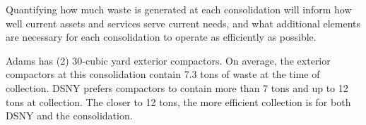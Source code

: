 
    Quantifying how much waste is generated at each consolidation will inform how well current assets and services serve current needs, and what additional elements are necessary for each consolidation to operate as efficiently as possible.
    
    Adams has (2) 30-cubic yard exterior compactors. On average, the exterior compactors at this consolidation contain 7.3 tons of waste at the time of collection. DSNY prefers compactors to contain more than 7 tons and up to 12 tons at collection. The closer to 12 tons, the more efficient collection is for both DSNY and the consolidation.